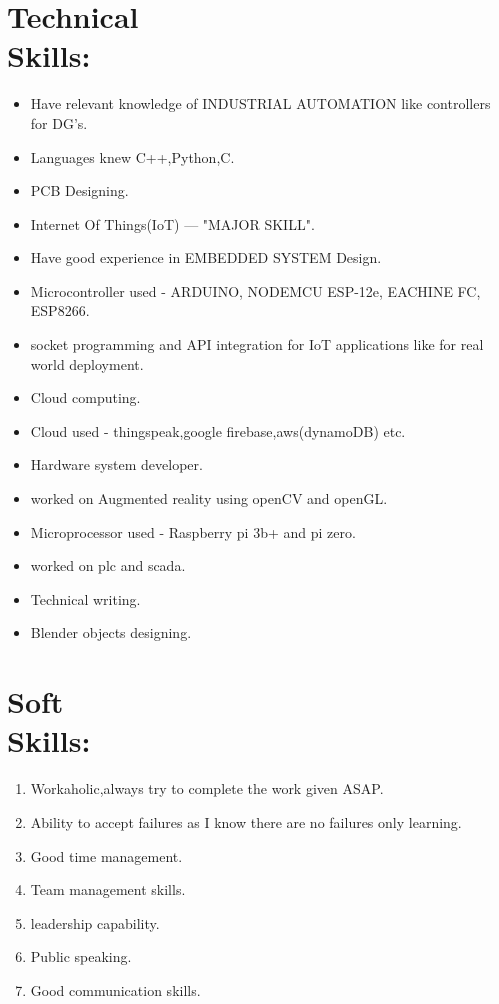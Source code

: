 \documentclass[10pt]{report}
\begin{document}
\section*{Technical \\Skills:} %
\begin{itemize}
\item Have relevant knowledge of INDUSTRIAL AUTOMATION like controllers for DG's.
\item Languages knew C++,Python,C.
\item PCB Designing.
\item Internet Of Things(IoT) --- "MAJOR SKILL". 
\item Have good experience in EMBEDDED SYSTEM Design.
\item Microcontroller used - ARDUINO, NODEMCU ESP-12e, EACHINE FC, ESP8266.
\item socket programming and API integration for IoT applications like for real world deployment.
\item Cloud computing.
\item Cloud used - thingspeak,google firebase,aws(dynamoDB) etc.
\item Hardware system developer.
\item worked on Augmented reality using openCV and openGL.
\item Microprocessor used - Raspberry pi 3b+ and pi zero.
\item worked on plc and scada.
\item Technical writing.
\item Blender objects designing.
\end{itemize}

\section*{Soft \\Skills:} %
\begin{enumerate}
	\item Workaholic,always try to complete the work given ASAP.
	\item Ability to accept failures as I know there are no failures only learning.
	\item Good time management.
	\item Team management skills.
	\item leadership capability.
	\item Public speaking.
	\item Good communication skills.
\end{enumerate}
\end{document}
